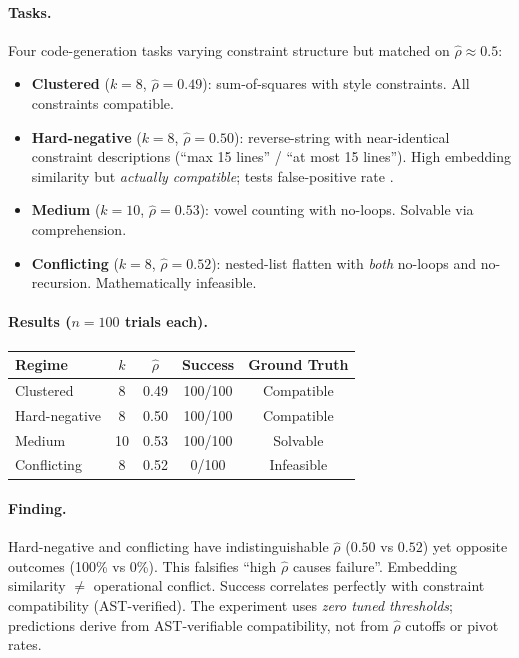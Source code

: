 \documentclass{article}
\theoremstyle{plain}
\theoremstyle{definition}
\theoremstyle{remark}
\newcommand{\rhohat}{\hat{\rho}}
\begin{document}
\paragraph{Tasks.}
Four code-generation tasks varying constraint structure but matched on $\rhohat{\approx}0.5$:
\begin{itemize}[nosep]
\item \textbf{Clustered} ($k{=}8$, $\rhohat{=}0.49$): sum-of-squares with style constraints. All constraints compatible.
\item \textbf{Hard-negative} ($k{=}8$, $\rhohat{=}0.50$): reverse-string with near-identical constraint descriptions (``max 15 lines'' / ``at most 15 lines''). High embedding similarity but \emph{actually compatible}; tests false-positive rate \citep{wei2023jailbroken,carlini2024aligned}.
\item \textbf{Medium} ($k{=}10$, $\rhohat{=}0.53$): vowel counting with no-loops. Solvable via comprehension.
\item \textbf{Conflicting} ($k{=}8$, $\rhohat{=}0.52$): nested-list flatten with \emph{both} no-loops and no-recursion. Mathematically infeasible.
\end{itemize}

\paragraph{Results ($n{=}100$ trials each).}
\begin{center}
\begin{tabular}{lcccc}
\toprule
Regime & $k$ & $\rhohat$ & Success & Ground Truth \\
\midrule
Clustered & 8 & 0.49 & 100/100 & Compatible \\
Hard-negative & 8 & 0.50 & 100/100 & Compatible \\
Medium & 10 & 0.53 & 100/100 & Solvable \\
Conflicting & 8 & 0.52 & 0/100 & Infeasible \\
\bottomrule
\end{tabular}
\end{center}

\paragraph{Finding.}
Hard-negative and conflicting have indistinguishable $\rhohat$ ($0.50$ vs $0.52$) yet opposite outcomes (100\% vs 0\%). This falsifies ``high $\rhohat$ causes failure''. Embedding similarity $\neq$ operational conflict. Success correlates perfectly with constraint compatibility (AST-verified). The experiment uses \emph{zero tuned thresholds}; predictions derive from AST-verifiable compatibility, not from $\rhohat$ cutoffs or pivot rates.
\end{document}
